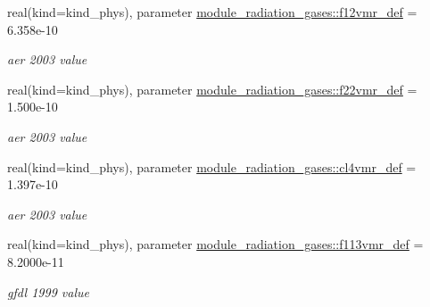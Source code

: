 \begin{DoxyCompactItemize}
real(kind=kind\+\_\+phys), parameter \hyperlink{group__module__radiation__gases_ga96d4f78070f30010626e0824b3421250}{module\+\_\+radiation\+\_\+gases\+::f12vmr\+\_\+def} = 6.\+358e-\/10
\begin{DoxyCompactList}\small\item\em aer 2003 value \end{DoxyCompactList}\item 
\mbox{\label{group__module__radiation__gases_gafd0018e96811ac64ef2abd8cab821eb5}} 
real(kind=kind\+\_\+phys), parameter \hyperlink{group__module__radiation__gases_gafd0018e96811ac64ef2abd8cab821eb5}{module\+\_\+radiation\+\_\+gases\+::f22vmr\+\_\+def} = 1.\+500e-\/10
\begin{DoxyCompactList}\small\item\em aer 2003 value \end{DoxyCompactList}\item 
\mbox{\label{group__module__radiation__gases_ga013f8faaee6df0c7c032e1786770c110}} 
real(kind=kind\+\_\+phys), parameter \hyperlink{group__module__radiation__gases_ga013f8faaee6df0c7c032e1786770c110}{module\+\_\+radiation\+\_\+gases\+::cl4vmr\+\_\+def} = 1.\+397e-\/10
\begin{DoxyCompactList}\small\item\em aer 2003 value \end{DoxyCompactList}\item 
\mbox{\label{group__module__radiation__gases_ga76ec88dc6284c48cfaae6cd05428b6dd}} 
real(kind=kind\+\_\+phys), parameter \hyperlink{group__module__radiation__gases_ga76ec88dc6284c48cfaae6cd05428b6dd}{module\+\_\+radiation\+\_\+gases\+::f113vmr\+\_\+def} = 8.\+2000e-\/11
\begin{DoxyCompactList}\small\item\em gfdl 1999 value \end{DoxyCompactList}\end{DoxyCompactItemize}
